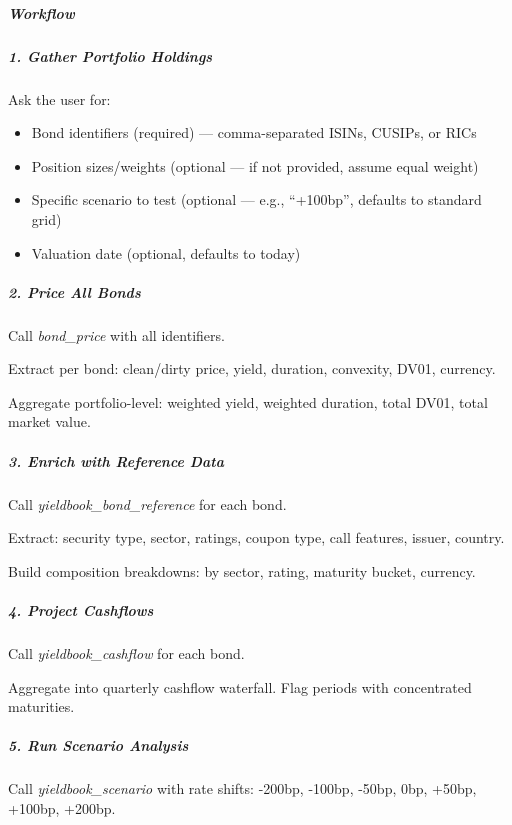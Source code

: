 \documentclass[11pt]{article}
\begin{document}
\subparagraph{Workflow}\mbox{}\par

\subparagraph{1. Gather Portfolio Holdings}\mbox{}\par

Ask the user for:

\begin{itemize}[leftmargin=*,itemsep=2pt,topsep=2pt]
\item {} Bond identifiers (required) — comma-separated ISINs, CUSIPs, or RICs
\item {} Position sizes/weights (optional — if not provided, assume equal weight)
\item {} Specific scenario to test (optional — e.g., ``+100bp'', defaults to standard grid)
\item {} Valuation date (optional, defaults to today)
\end{itemize}

\subparagraph{2. Price All Bonds}\mbox{}\par

Call \emph{bond\_\allowbreak{}price} with all identifiers.


Extract per bond: clean/dirty price, yield, duration, convexity, DV01, currency.


Aggregate portfolio-level: weighted yield, weighted duration, total DV01, total market value.


\subparagraph{3. Enrich with Reference Data}\mbox{}\par

Call \emph{yieldbook\_\allowbreak{}bond\_\allowbreak{}reference} for each bond.


Extract: security type, sector, ratings, coupon type, call features, issuer, country.


Build composition breakdowns: by sector, rating, maturity bucket, currency.


\subparagraph{4. Project Cashflows}\mbox{}\par

Call \emph{yieldbook\_\allowbreak{}cashflow} for each bond.


Aggregate into quarterly cashflow waterfall. Flag periods with concentrated maturities.


\subparagraph{5. Run Scenario Analysis}\mbox{}\par

Call \emph{yieldbook\_\allowbreak{}scenario} with rate shifts: -200bp, -100bp, -50bp, 0bp, +50bp, +100bp, +200bp.
\end{document}
